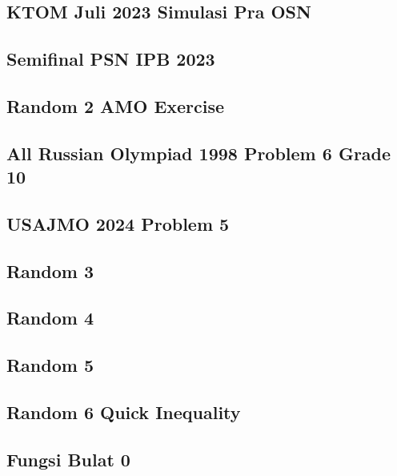 \subsection{KTOM Juli 2023 Simulasi Pra OSN}


\subsection{Semifinal PSN IPB 2023}


\subsection{Random 2 AMO Exercise}


\subsection{All Russian Olympiad 1998 Problem 6 Grade 10}


\subsection{USAJMO 2024 Problem 5}


\subsection{Random 3}


\subsection{Random 4}


\subsection{Random 5}


\subsection{Random 6 Quick Inequality}


\subsection{Fungsi Bulat 0}


